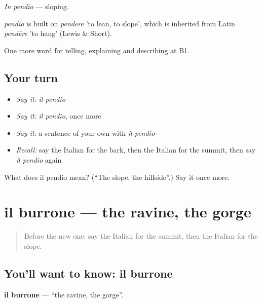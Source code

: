 \emph{In pendio} — sloping.

\begin{cousinweb}
\emph{pendio} is built on \emph{pendere} 'to lean, to slope', which is inherited from Latin \emph{pendēre} 'to hang' (Lewis \& Short).
\end{cousinweb}

\begin{grammarlens}[title={What you've built}]
One more word for telling, explaining and describing at B1.
\end{grammarlens}

\subsection*{Your turn}
\begin{itemize}
\raggedright
  \item \emph{Say it:} \emph{il pendio}
  \item \emph{Say it:} \emph{il pendio}, once more
  \item \emph{Say it:} a sentence of your own with \emph{il pendio}
  \item \emph{Recall:} say the Italian for the bark, then the Italian for the summit, then say \emph{il pendio} again
\end{itemize}

\begin{tcolorbox}[breakable,colback=teal!4,colframe=teal!35!black,title={Before you move on}]
What does il pendio mean? (\textquotedblleft{}The slope, the hillside\textquotedblright{}.) Say it once more.
\end{tcolorbox}
\section[il burrone]{il burrone — the ravine, the gorge}

\label{lesson:IT-C462-burrone}



\begin{quote}
Before the new one: say the Italian for the summit, then the Italian for the slope.
\end{quote}

\subsection*{You'll want to know: il burrone}
\textbf{il burrone} — \textquotedblleft{}the ravine, the gorge\textquotedblright{}.

